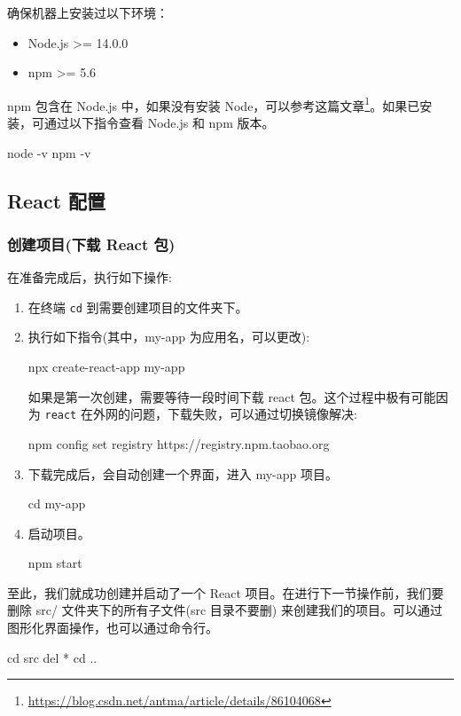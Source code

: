 确保机器上安装过以下环境：
\begin{itemize}
    \item Node.js >= 14.0.0
    \item npm >= 5.6
\end{itemize}

npm 包含在 Node.js 中，如果没有安装 Node，可以参考这篇文章\footnote{\url{https://blog.csdn.net/antma/article/details/86104068}}。如果已安装，可通过以下指令查看 Node.js 和 npm 版本。

\begin{bash}
node -v
npm -v
\end{bash}

\subsection{React 配置}
\subsubsection{创建项目(下载 React 包)}

在准备完成后，执行如下操作:
\begin{enumerate}
    \item 在终端 \texttt{cd} 到需要创建项目的文件夹下。
    \item 执行如下指令(其中，my-app 为应用名，可以更改):
\begin{bash}
npx create-react-app my-app
\end{bash}
    如果是第一次创建，需要等待一段时间下载 react 包。这个过程中极有可能因为 \texttt{react} 在外网的问题，下载失败，可以通过切换镜像解决:
\begin{bash}
npm config set registry https://registry.npm.taobao.org
\end{bash}
    \item 下载完成后，会自动创建一个界面，进入 my-app 项目。
\begin{bash}
cd my-app
\end{bash}
    \item 启动项目。
\begin{bash}
npm start
\end{bash}
\end{enumerate}

至此，我们就成功创建并启动了一个 React 项目。在进行下一节操作前，我们要删除 src/ 文件夹下的所有子文件(src 目录不要删) 来创建我们的项目。可以通过图形化界面操作，也可以通过命令行。

\begin{bash}
cd src
del *
cd ..
\end{bash}